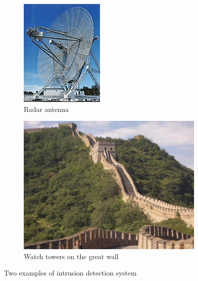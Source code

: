 \begin{figure}[ht]
    \centering 
    \begin{subfigure}[b]{0.281\textwidth} 
        \includegraphics[width=\textwidth]{figures/Radar_antenna.jpg} 
        \caption{Radar antenna} 
        \label{fig:intro-radar} 
    \end{subfigure} 
    \begin{subfigure}[b]{0.48\textwidth} 
        \includegraphics[width=\textwidth]{figures/great_wall.jpg} 
        \caption{Watch towers on the great wall} 
        \label{fig:intro-great_wall} 
    \end{subfigure}
    \caption{Two examples of intrusion detection system}
    \label{fig:intro-IDS}
\end{figure} 

